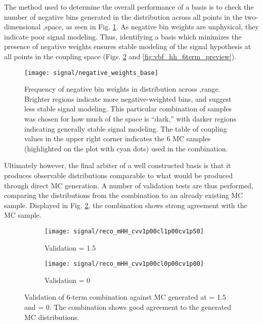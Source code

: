     The method used to determine the overall performance of a basis is to check the number of negative bins generated
        in the \mhh distribution across all points in the two-dimensional \kvv,\kl space, as seen in Fig. \ref{fig:vbf_hh_6term_nWeight_grid}.
    As negative bin weights are unphysical, they indicate poor signal modeling.
    Thus, identifying a basis which minimizes the presence of negative weights
        ensures stable modeling of the signal hypothesis at all points in the coupling space
        (Figs. \ref{fig:vbf_hh_6term_validation} and \ref{fig:vbf_hh_6term_preview}).

    \begin{figure}[tbh]
        \texttt{[image: signal/negative\_weights\_base]}
        \caption{
            Frequency of negative bin weights in \mhh distribution across \kvv,\kl range.
            Brighter regions indicate more negative-weighted bins, and suggest less stable signal modeling.
            This particular combination of samples was chosen for how much of the space is ``dark,''
                with darker regions indicating generally stable signal modeling.
            The table of coupling values in the upper right corner indicates the 6 MC samples
                (highlighted on the plot with cyan dots) used in the combination.
        }
        \label{fig:vbf_hh_6term_nWeight_grid}
    \end{figure}

    Ultimately however, the final arbiter of a well constructed basis is that it produces observable distributions comparable to what would be produced through direct MC generation.
    A number of validation tests are thus performed, comparing the distributions from the combination to an already existing MC sample.
    Displayed in Fig. \ref{fig:vbf_hh_6term_validation}, the combination shows strong agreement with the MC sample.

    \begin{figure}[tbh]
        \begin{subfigure}{0.48\textwidth}
            \texttt{[image: signal/reco\_mHH\_cvv1p00cl1p00cv1p50]}
            \captionsetup{justification=centering} \caption{Validation \kv = 1.5}
        \end{subfigure}
        \begin{subfigure}{0.48\textwidth}
            \texttt{[image: signal/reco\_mHH\_cvv1p00cl0p00cv1p00]}
            \captionsetup{justification=centering} \caption{Validation \kl = 0}
        \end{subfigure}
        \caption{
            Validation of 6-term combination against MC generated at \kv = 1.5 and \kl = 0.
            The combination shows good agreement to the generated MC distributions.
        }
        \label{fig:vbf_hh_6term_validation}
    \end{figure}

